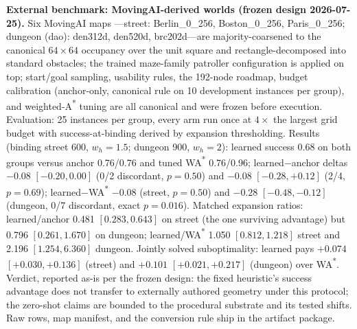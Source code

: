 \documentclass[letterpaper]{article} %
\begin{document}
\textbf{External benchmark: MovingAI-derived worlds (frozen design 2026-07-25).} Six MovingAI maps \citep{sturtevant2012movingai}---street: Berlin\_0\_256, Boston\_0\_256, Paris\_0\_256; dungeon (dao): den312d, den520d, brc202d---are majority-coarsened to the canonical $64{\times}64$ occupancy over the unit square and rectangle-decomposed into standard obstacles; the trained maze-family patroller configuration is applied on top; start/goal sampling, usability rules, the 192-node roadmap, budget calibration (anchor-only, canonical rule on 10 development instances per group), and weighted-A\textsuperscript{*} tuning are all canonical and were frozen before execution. Evaluation: 25 instances per group, every arm run once at $4\times$ the largest grid budget with success-at-binding derived by expansion thresholding. Results (binding street 600, $w_h{=}1.5$; dungeon 900, $w_h{=}2$): learned success 0.68 on both groups versus anchor 0.76/0.76 and tuned WA\textsuperscript{*} 0.76/0.96; learned$-$anchor deltas $-0.08$ $[-0.20, 0.00]$ (0/2 discordant, $p{=}0.50$) and $-0.08$ $[-0.28, +0.12]$ (2/4, $p{=}0.69$); learned$-$WA\textsuperscript{*} $-0.08$ (street, $p{=}0.50$) and $-0.28$ $[-0.48,-0.12]$ (dungeon, 0/7 discordant, exact $p{=}0.016$). Matched expansion ratios: learned/anchor 0.481 $[0.283, 0.643]$ on street (the one surviving advantage) but 0.796 $[0.261, 1.670]$ on dungeon; learned/WA\textsuperscript{*} 1.050 $[0.812, 1.218]$ street and 2.196 $[1.254, 6.360]$ dungeon. Jointly solved suboptimality: learned pays $+0.074$ $[+0.030, +0.136]$ (street) and $+0.101$ $[+0.021, +0.217]$ (dungeon) over WA\textsuperscript{*}. Verdict, reported as-is per the frozen design: the fixed heuristic's success advantage does not transfer to externally authored geometry under this protocol; the zero-shot claims are bounded to the procedural substrate and its tested shifts. Raw rows, map manifest, and the conversion rule ship in the artifact package.
\end{document}
